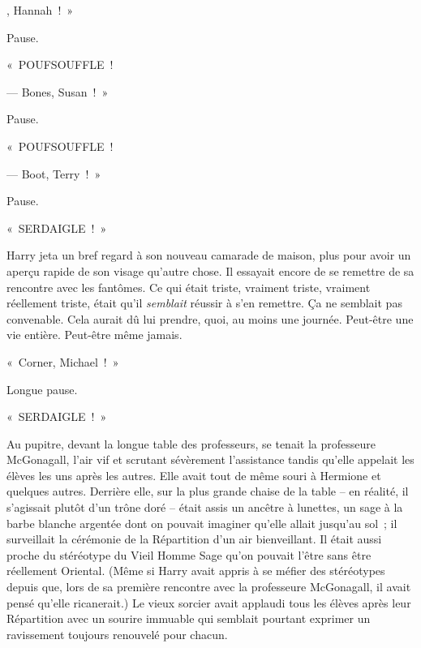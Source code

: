 

, Hannah~!~»

\hplettrineextrapara
Pause.

«~POUFSOUFFLE~!

--- Bones, Susan~!~»

Pause.

«~POUFSOUFFLE~!

--- Boot, Terry~!~»

Pause.

«~SERDAIGLE~!~»

Harry jeta un bref regard à son nouveau camarade de maison, plus pour avoir un aperçu rapide de son visage qu'autre chose.
Il essayait encore de se remettre de sa rencontre avec les fantômes.
Ce qui était triste, vraiment triste, vraiment réellement triste, était qu'il \emph{semblait} réussir à s'en remettre.
Ça ne semblait pas convenable.
Cela aurait dû lui prendre, quoi, au moins une journée.
Peut-être une vie entière.
Peut-être même jamais.

«~Corner, Michael~!~»

Longue pause.

«~SERDAIGLE~!~»

Au pupitre, devant la longue table des professeurs, se tenait la professeure McGonagall, l'air vif et scrutant sévèrement l'assistance tandis qu'elle appelait les élèves les uns après les autres.
Elle avait tout de même souri à Hermione et quelques autres.
Derrière elle, sur la plus grande chaise de la table -- en réalité, il s'agissait plutôt d'un trône doré -- était assis un ancêtre à lunettes, un sage à la barbe blanche argentée dont on pouvait imaginer qu'elle allait jusqu'au sol~; il surveillait la cérémonie de la Répartition d'un air bienveillant.
Il était aussi proche du stéréotype du Vieil Homme Sage qu'on pouvait l'être sans être réellement Oriental.
(Même si Harry avait appris à se méfier des stéréotypes depuis que, lors de sa première rencontre avec la professeure McGonagall, il avait pensé qu'elle ricanerait.)
Le vieux sorcier avait applaudi tous les élèves après leur Répartition avec un sourire immuable qui semblait pourtant exprimer un ravissement toujours renouvelé pour chacun.


